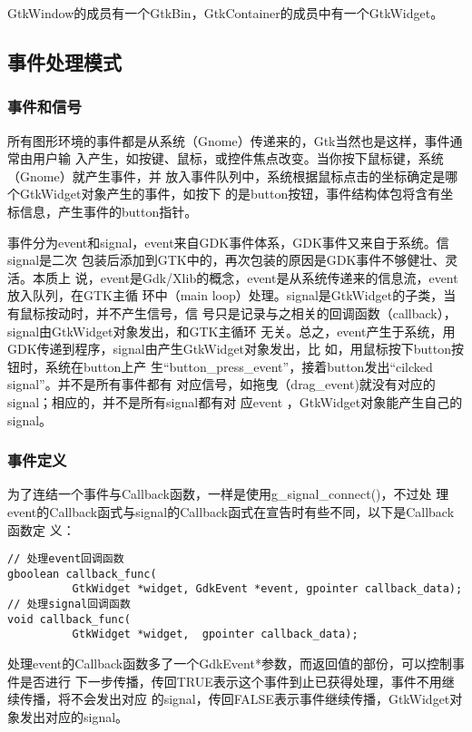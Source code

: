 GtkWindow的成员有一个GtkBin，GtkContainer的成员中有一个GtkWidget。

\subsection{事件处理模式}

\subsubsection{事件和信号}

所有图形环境的事件都是从系统（Gnome）传递来的，Gtk当然也是这样，事件通常由用户输
入产生，如按键、鼠标，或控件焦点改变。当你按下鼠标键，系统（Gnome）就产生事件，并
放入事件队列中，系统根据鼠标点击的坐标确定是哪个GtkWidget对象产生的事件，如按下
的是button按钮，事件结构体包将含有坐标信息，产生事件的button指针。

事件分为event和signal，event来自GDK事件体系，GDK事件又来自于系统。信signal是二次
包装后添加到GTK中的，再次包装的原因是GDK事件不够健壮、灵活。本质上
说，event是Gdk/Xlib的概念，event是从系统传递来的信息流，event放入队列，在GTK主循
环中（main loop）处理。signal是GtkWidget的子类，当有鼠标按动时，并不产生信号，信
号只是记录与之相关的回调函数（callback），signal由GtkWidget对象发出，和GTK主循环
无关。总之，event产生于系统，用GDK传递到程序，signal由产生GtkWidget对象发出，比
如，用鼠标按下button按钮时，系统在button上产
生``button\_press\_event''，接着button发出``cilcked signal''。并不是所有事件都有
对应信号，如拖曳（drag\_event)就没有对应的signal；相应的，并不是所有signal都有对
应event ，GtkWidget对象能产生自己的signal。

\subsubsection{事件定义}

为了连结一个事件与Callback函数，一样是使用g\_signal\_connect()，不过处
理event的Callback函式与signal的Callback函式在宣告时有些不同，以下是Callback函数定
义：

\begin{shell}
\begin{verbatim}
// 处理event回调函数
gboolean callback_func(
          GtkWidget *widget, GdkEvent *event, gpointer callback_data);
// 处理signal回调函数
void callback_func(
          GtkWidget *widget,  gpointer callback_data);
\end{verbatim}
\end{shell}

处理event的Callback函数多了一个GdkEvent*参数，而返回值的部份，可以控制事件是否进行
下一步传播，传回TRUE表示这个事件到止已获得处理，事件不用继续传播，将不会发出对应
的signal，传回FALSE表示事件继续传播，GtkWidget对象发出对应的signal。

